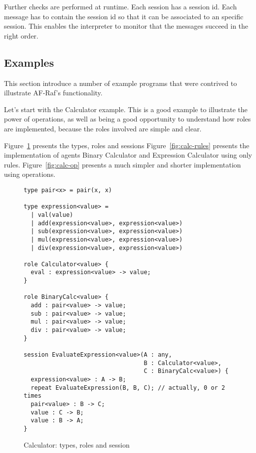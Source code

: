 \documentclass[a4paper,12pt,oneside,fleqn]{book} %
\theoremstyle{plain}
\theoremstyle{definition}
\theoremstyle{remark}
\begin{document}
Further checks are performed at runtime. Each session has a session id.
Each message has to contain the session id so that it can be associated to
an specific session. This enables the interpreter to monitor that the
messages succeed in the right order.


\subsection{Examples} %

This section introduce a number of example programs that were contrived to
illustrate AF-Raf's functionality.

Let's start with the Calculator example. This is a good example to
illustrate the power of operations, as well as being a good opportunity to
understand how roles are implemented, because the roles involved are simple
and clear. 

Figure~\ref{fig:calc-roles} presents the types, roles and sessions Figure~\ref{fig:calc-rules} presents the implementation of agents Binary
Calculator and Expression Calculator using only rules.
Figure~\ref{fig:calc-op} presents a much simpler and shorter implementation
using operations.

\begin{figure}\footnotesize %
\begin{verbatim}
type pair<x> = pair(x, x)

type expression<value> =
  | val(value)
  | add(expression<value>, expression<value>)
  | sub(expression<value>, expression<value>)
  | mul(expression<value>, expression<value>)
  | div(expression<value>, expression<value>)
        
role Calculator<value> {
  eval : expression<value> -> value;
}

role BinaryCalc<value> {
  add : pair<value> -> value;
  sub : pair<value> -> value;
  mul : pair<value> -> value;
  div : pair<value> -> value;
}

session EvaluateExpression<value>(A : any, 
                                  B : Calculator<value>,
                                  C : BinaryCalc<value>) {
  expression<value> : A -> B;
  repeat EvaluateExpression(B, B, C); // actually, 0 or 2 times
  pair<value> : B -> C;
  value : C -> B;
  value : B -> A;
}
\end{verbatim}
\caption{Calculator: types, roles and session}
\label{fig:calc-roles}
\end{figure} %
\end{document}
